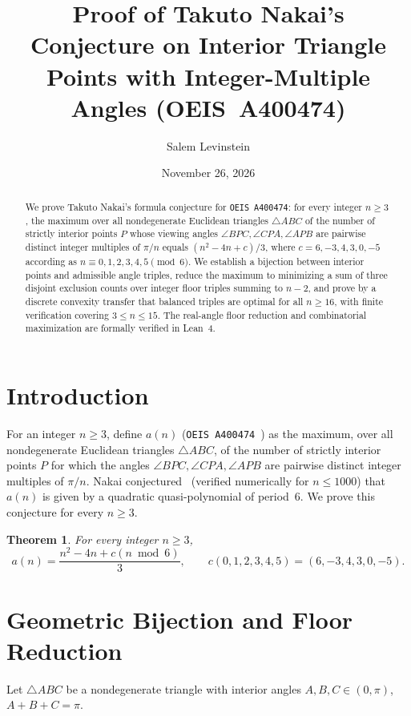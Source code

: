 \documentclass[11pt]{article}
\title{Proof of Takuto Nakai's Conjecture on Interior Triangle Points with Integer-Multiple Angles (OEIS~A400474)}
\author{Salem Levinstein}
\date{November 26, 2026}
\newtheorem{theorem}{Theorem}
\begin{document}
\maketitle

\begin{abstract}
We prove Takuto Nakai's formula conjecture for \texttt{OEIS~A400474}: for every integer $n \ge 3$, the maximum over all nondegenerate Euclidean triangles $\triangle ABC$ of the number of strictly interior points $P$ whose viewing angles $\angle BPC, \angle CPA, \angle APB$ are pairwise distinct integer multiples of $\pi/n$ equals $(n^2 - 4n + c)/3$, where $c = 6, -3, 4, 3, 0, -5$ according as $n \equiv 0, 1, 2, 3, 4, 5 \pmod 6$. We establish a bijection between interior points and admissible angle triples, reduce the maximum to minimizing a sum of three disjoint exclusion counts over integer floor triples summing to $n - 2$, and prove by a discrete convexity transfer that balanced triples are optimal for all $n \ge 16$, with finite verification covering $3 \le n \le 15$. The real-angle floor reduction and combinatorial maximization are formally verified in Lean~4.
\end{abstract}

\section{Introduction}

For an integer $n \ge 3$, define $a(n)$ (\texttt{OEIS~A400474}~\cite{Nakai2026}) as the maximum, over all nondegenerate Euclidean triangles $\triangle ABC$, of the number of strictly interior points $P$ for which the angles $\angle BPC, \angle CPA, \angle APB$ are pairwise distinct integer multiples of $\pi / n$. Nakai conjectured~\cite{Nakai2026} (verified numerically for $n \le 1000$) that $a(n)$ is given by a quadratic quasi-polynomial of period~$6$. We prove this conjecture for every $n \ge 3$.

\begin{theorem}\label{thm:main}
For every integer $n \ge 3$,
\[
  a(n) = \frac{n^2 - 4n + c(n \bmod 6)}{3}, \qquad c(0, 1, 2, 3, 4, 5) = (6, -3, 4, 3, 0, -5).
\]
\end{theorem}

\section{Geometric Bijection and Floor Reduction}

Let $\triangle ABC$ be a nondegenerate triangle with interior angles $A, B, C \in (0, \pi)$, $A + B + C = \pi$.
\end{document}
